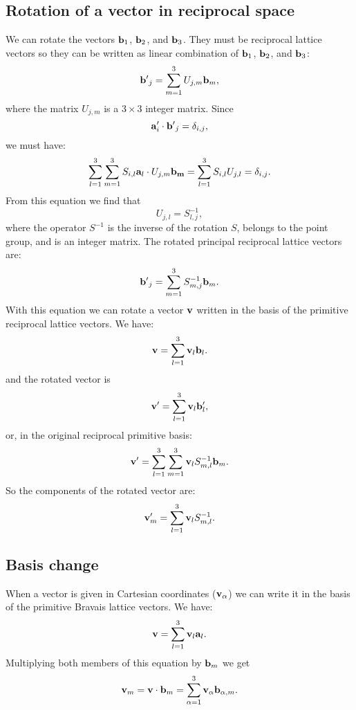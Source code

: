 \documentclass[12pt,a4paper,twoside]{report}
\begin{document}
\subsection{Rotation of a vector in reciprocal space}
We can rotate the vectors
${\bf b}_1$, ${\bf b}_2$,
and ${\bf b}_3$. They must be reciprocal lattice vectors so they can be written as linear combination
of ${\bf b}_1$, ${\bf b}_2$,
and ${\bf b}_3$:
\begin{equation}
{\bf b'}_j = \sum_{m=1}^3 U_{j,m} {\bf b}_m,
\end{equation}
where the matrix $U_{j,m}$ is a $3\times 3$ integer matrix.
Since
\begin{equation}
{\bf a}'_i \cdot {\bf b'}_j = \delta_{i,j},
\end{equation}
we must have:
\begin{equation}
\sum_{l=1}^3 \sum_{m=1}^3 S_{i,l} {\bf a}_l \cdot U_{j,m} {\bf b_m} =  \sum_{l=1}^3 S_{i,l} U_{j,l} =
\delta_{i,j}.
\end{equation}
From this equation we find that
\begin{equation}
U_{j,l} = S^{-1}_{l,j},
\end{equation}
where the operator $S^{-1}$ is the inverse of the rotation $S$, belongs to the point group, and is an integer matrix.
The rotated principal reciprocal lattice vectors are:
\begin{equation}
{\bf b'}_j = \sum_{m=1}^3 S^{-1}_{m,j} {\bf b}_m.
\end{equation}
With this equation we can rotate 
a vector ${\bf v}$ written in the basis of
the primitive reciprocal lattice vectors. We have:
\begin{equation}
{\bf v} = \sum_{l=1}^3 {\bf v}_l {\bf b}_l.
\end{equation}
and the rotated vector is
\begin{equation}
{\bf v}' = \sum_{l=1}^3 {\bf v}_l {\bf b}'_l,
\end{equation}
or, in the original reciprocal primitive basis:
\begin{equation}
{\bf v}' = \sum_{l=1}^3 \sum_{m=1}^3 {\bf v}_l S^{-1}_{m,l} {\bf b}_m.
\end{equation}
So the components of the rotated vector are:
\begin{equation}
{\bf v}'_m = \sum_{l=1}^3 {\bf v}_l S^{-1}_{m,l}.
\label{rotreccomp}
\end{equation}

\subsection{Basis change}
When a vector is given in Cartesian coordinates (${\bf v}_{\alpha}$) we can write it in the basis of the primitive Bravais lattice vectors.
We have:
\begin{equation}
{\bf v}= \sum_{l=1}^3 {\bf v}_l {\bf a}_l.
\end{equation}
Multiplying both members of this equation by ${\bf b}_m$
we get
\begin{equation}
{\bf v}_m= {\bf v} \cdot {\bf b}_m=\sum_{\alpha=1}^3
{\bf v}_{\alpha} {\bf b}_{\alpha,m}.
\end{equation}
\end{document}
